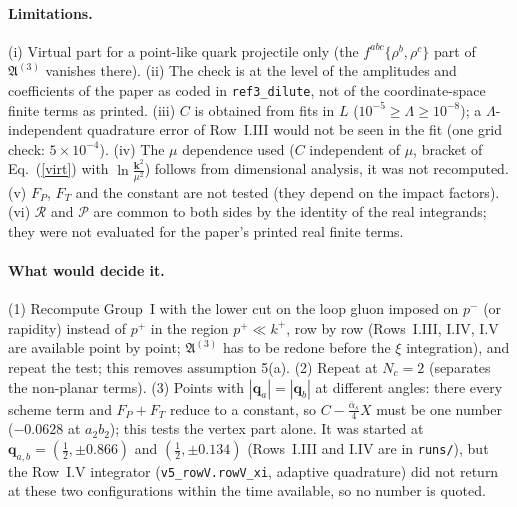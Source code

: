 \documentclass[11pt,a4paper]{article}
\renewcommand{\v}[1]{\bm{#1}}
\newcommand{\ab}{\bar\alpha_s}
\begin{document}
\paragraph{Limitations.} (i) Virtual part for a point-like quark projectile only (the $f^{abc}\{\rho^b,\rho^c\}$ part of $\mathfrak A^{(3)}$ vanishes there). (ii) The check is at the level of the amplitudes and coefficients of the paper as coded in \texttt{ref3\_dilute}, not of the coordinate-space finite terms as printed. (iii) $C$ is obtained from fits in $L$ ($10^{-5}\ge\Lambda\ge10^{-8}$); a $\Lambda$-independent quadrature error of Row~I.III would not be seen in the fit (one grid check: $5\times10^{-4}$). (iv) The $\mu$ dependence used ($C$ independent of $\mu$, bracket of Eq.~(\ref{virt}) with $\ln\frac{\v k^2}{\mu^2}$) follows from dimensional analysis, it was not recomputed. (v) $F_P$, $F_T$ and the constant are not tested (they depend on the impact factors). (vi) $\mathcal R$ and $\mathcal P$ are common to both sides by the identity of the real integrands; they were not evaluated for the paper's printed real finite terms.
\paragraph{What would decide it.} (1) Recompute Group~I with the lower cut on the loop gluon imposed on $p^-$ (or rapidity) instead of $p^+$ in the region $p^+\ll k^+$, row by row (Rows~I.III, I.IV, I.V are available point by point; $\mathfrak A^{(3)}$ has to be redone before the $\xi$ integration), and repeat the test; this removes assumption 5(a). (2) Repeat at $N_c=2$ (separates the non-planar terms). (3) Points with $|\v q_a|=|\v q_b|$ at different angles: there every scheme term and $F_P+F_T$ reduce to a constant, so $C-\frac{\ab}{4}X$ must be one number ($-0.0628$ at $a_2b_2$); this tests the vertex part alone. It was started at $\v q_{a,b}=(\frac12,\pm0.866)$ and $(\frac12,\pm0.134)$ (Rows~I.III and I.IV are in \texttt{runs/}), but the Row~I.V integrator (\texttt{v5\_rowV.rowV\_xi}, adaptive quadrature) did not return at these two configurations within the time available, so no number is quoted.
\end{document}
